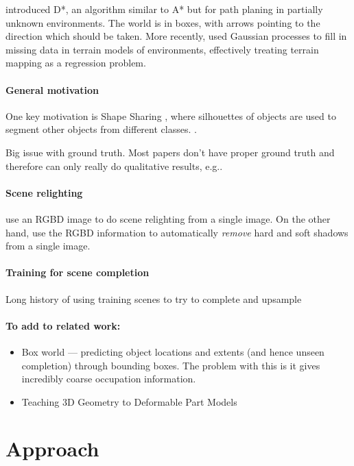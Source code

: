 \documentclass[10pt,a4paper, twocolumn]{article}
\makeatletter
\newcommand*{\eg}{e.g.\@\xspace}
\makeatother
\begin{document}
\cite{stentz-icra-1994} introduced D*, an algorithm similar to A* but for path planing in partially unknown environments. 
The world is in boxes, with arrows pointing to the direction which should be taken.
More recently, \cite{plagemann-iros-2008} used Gaussian processes to fill in missing data in terrain models of environments, effectively treating terrain mapping as a regression problem.

\paragraph{General motivation}
One key motivation is Shape Sharing \cite{kim-eccv-2012}, where silhouettes of objects are used to segment other objects from different classes.
 \cite{nan-acm-2012}.

Big issue with ground truth. Most papers don't have proper ground truth and therefore can only really do qualitative results, \eg \cite{all the papers...}.

\paragraph{Scene relighting}
\cite{ikeda-acpr-2013} use an RGBD image to do scene relighting from a single image.
On the other hand, \cite{xiao-cvpr-2014} use the RGBD information to automatically \textit{remove} hard and soft shadows from a single image.

\paragraph{Training for scene completion}
Long history of using training scenes to try to complete and upsample

\paragraph{To add to related work:}
\begin{itemize}
\item Box world --- predicting object locations and extents (and hence unseen completion) through bounding boxes. 
The problem with this is it gives incredibly coarse occupation information.
\item Teaching 3D Geometry to Deformable Part Models
\end{itemize}


\section{Approach}
\end{document}
